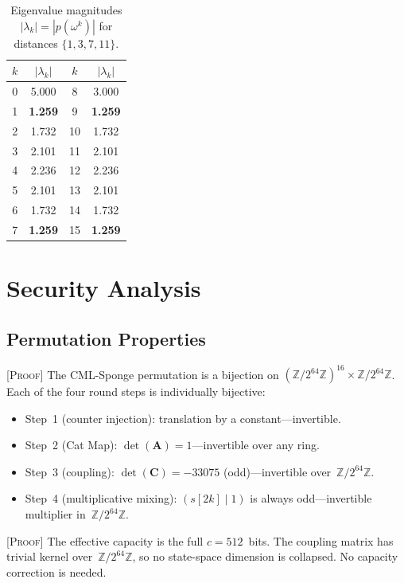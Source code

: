 \documentclass[runningheads]{llncs}
\newcommand{\proof}[1]{\textsc{[Proof]} #1}
\newcommand{\Ztwo}{\mathbb{Z}/2^{64}\mathbb{Z}}
\newcommand{\catmap}{\mathbf{A}}
\newcommand{\coupmat}{\mathbf{C}}
\begin{document}
\begin{table}[h]
\centering
\caption{Eigenvalue magnitudes $|\lambda_k| = |p(\omega^k)|$ for distances $\{1,3,7,11\}$.}
\label{tab:eigenvalues}
\begin{tabular}{@{}cc|cc@{}}
\toprule
$k$ & $|\lambda_k|$ & $k$ & $|\lambda_k|$ \\
\midrule
0 & 5.000 & 8 & 3.000 \\
1 & \textbf{1.259} & 9 & \textbf{1.259} \\
2 & 1.732 & 10 & 1.732 \\
3 & 2.101 & 11 & 2.101 \\
4 & 2.236 & 12 & 2.236 \\
5 & 2.101 & 13 & 2.101 \\
6 & 1.732 & 14 & 1.732 \\
7 & \textbf{1.259} & 15 & \textbf{1.259} \\
\bottomrule
\end{tabular}
\end{table}

\section{Security Analysis}
\label{sec:security}

\subsection{Permutation Properties}

\proof{The CML-Sponge permutation is a bijection on $(\Ztwo)^{16} \times \Ztwo$.
Each of the four round steps is individually bijective:}
\begin{itemize}[nosep]
\item Step~1 (counter injection): translation by a constant---invertible.
\item Step~2 (Cat Map): $\det(\catmap) = 1$---invertible over any ring.
\item Step~3 (coupling): $\det(\coupmat) = -33075$ (odd)---invertible over~$\Ztwo$.
\item Step~4 (multiplicative mixing): $(s[2k] \mathbin{|} 1)$ is always odd---invertible
  multiplier in~$\Ztwo$.
\end{itemize}

\proof{The effective capacity is the full $c = 512$~bits.
The coupling matrix has trivial kernel over~$\Ztwo$, so no state-space dimension
is collapsed.  No capacity correction is needed.}
\end{document}
